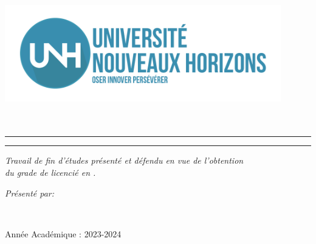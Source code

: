\begin{titlepage}
    \begin{center}
        \large
        
        \vspace*{.03\textheight}
        \includegraphics[width=12cm]{Images/logo_unh} \\[0.75cm]
        
        {\LARGE{{\textsc{\myFaculty}}} }\\[0.2cm]
        
        {\LARGE{{{\myDepartment}}} }\\
        \medskip %
        
        \vspace{2.5cm} 
        \begin{center}
            \rule{0.9\textwidth}{.2pt}
        \end{center}
        \vspace{0.2cm}
        
        {\LARGE \bfseries {\myTitle}}
        
        \begin{center}
            \rule{0.9\textwidth}{.2pt}
        \end{center}

        \begin{flushright}
            {\slshape \textit{Travail de fin d’études présenté et défendu en vue de l’obtention\\ du grade de licencié en \myFaculty.}}\\[2cm] 
        \end{flushright}
        
        \begin{minipage}[t]{0.55\textwidth}
            \begin{flushright}
                \large
                \emph{Présenté par:} \textbf{{\myName}}
            \end{flushright}
        \end{minipage}\\[3cm]
        \vfill
        
        {\large Année Académique : 2023-2024}\\
    \end{center}
\end{titlepage}
